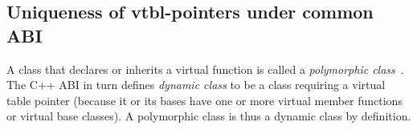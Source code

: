 %

\subsection{Uniqueness of vtbl-pointers under common ABI}
\label{sec:uniq}

A class that declares or inherits a virtual function is called a 
\emph{polymorphic class}~\cite[]{C++0x}. The C++ ABI in turn defines 
\emph{dynamic class} to be a class requiring a virtual table pointer (because it 
or its bases have one or more virtual member functions or virtual base classes). 
A polymorphic class is thus a dynamic class by definition.

